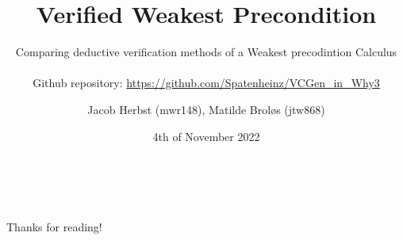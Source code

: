 \documentclass[a4paper]{article}
\title{\textbf{Verified Weakest Precondition}}
\subtitle{Comparing deductive verification methods of a Weakest precodintion Calculus\\~\\
\small{Github repository: \url{https://github.com/Spatenheinz/VCGen_in_Why3}} }
\author{Jacob Herbst (mwr148), Matilde Broløs (jtw868)} \date{4th of November 2022} \advisor{Advisor: Ken Friis Larsen}
\begin{document}
\maketitle

\tableofcontents

\newpage












\\~\\
Thanks for reading!

\newpage
\printbibliography
\newpage
\appendix


\newpage

\end{document}
